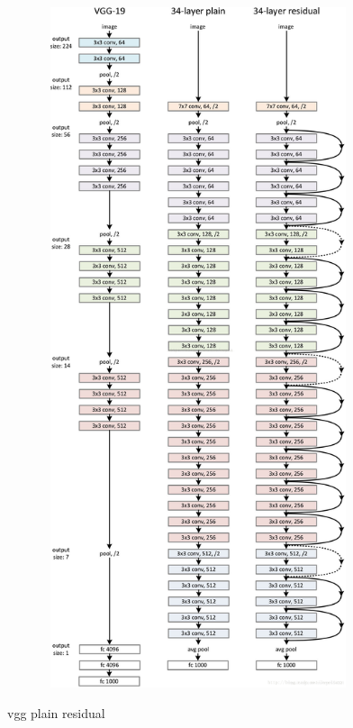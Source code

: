 \documentclass[12pt]{ctexart}%
\begin{document}
			\begin{figure}[H]
				\vspace{-0.2cm}  %
				\setlength{\abovecaptionskip}{-0.2cm}   %
				\centering
				\includegraphics[height=20cm,width=12cm]{vgg_plain_residual.png}
				\renewcommand{\figurename}{Fig} %
				\caption{vgg plain residual}
				\label{fig17:vgg plain residual}
			\end{figure}
		
\end{document}

